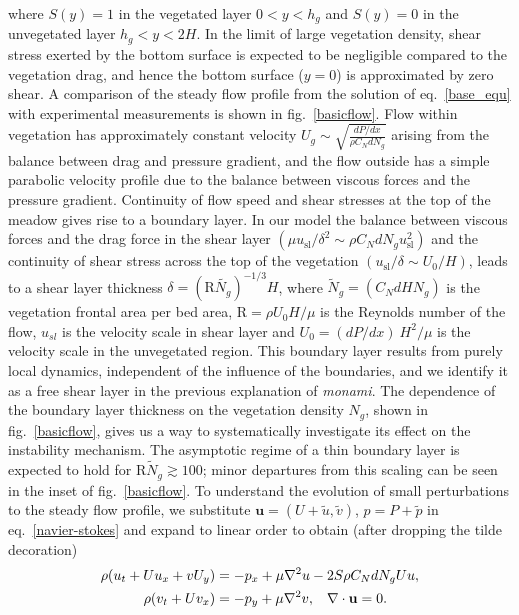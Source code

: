 \documentclass[aps,prl,twocolumn,superscriptaddress,10pt]{revtex4-1}  %
\newcommand{\bu}{\mathbf{u}}
\newcommand{\hg}{h_g}
\newcommand{\Rey}{\text{R}}
\newcommand{\Ndg}{\tilde{N}_g}
\newcommand{\monami}{\textit{monami}}
\begin{document}
where $S(y)=1$ in the vegetated layer $0<y<\hg$ and $S(y)=0$ in the unvegetated layer $\hg< y< 2H$. 
In the limit of large vegetation density, shear stress exerted by the bottom surface is expected to be negligible compared to the vegetation drag, and hence the bottom surface ($y=0$) is approximated by zero shear.   
A comparison of the steady flow profile from the solution of eq.~\eqref{base_equ} with experimental measurements is shown in fig.~\ref{basicflow}.
Flow within vegetation has approximately constant velocity $U_g \sim \sqrt{\frac{dP/dx}{\rho C_N dN_g}}$ arising from the balance between drag and pressure gradient, and the flow outside has a simple parabolic velocity profile due to the balance between viscous forces and the pressure gradient. 
Continuity of flow speed and shear stresses at the top of the meadow gives rise to a boundary layer.
In our model the balance between viscous forces and the drag force in the shear layer $(\mu u_\text{sl}/\delta^2 \sim \rho C_N d N_g u_\text{sl}^2)$ and the continuity of shear stress across the top of the vegetation $(u_\text{sl}/\delta \sim U_0/H)$, leads to a shear layer thickness $\delta=(\Rey\tilde{N_g})^{-1/3}H$, where $\Ndg = \left(C_N d H N_g\right)$ is the vegetation frontal area per bed area, $\Rey=\rho U_0 H/\mu$ is the Reynolds number of the flow, $u_{sl}$ is the velocity scale in shear layer and $U_0 = {(dP/dx)~H^2}/{\mu}$ is the velocity scale in the unvegetated region. 
This boundary layer results from purely local dynamics, independent of the influence of the boundaries, and we identify it as a free shear layer \cite{Ghisal02} in the previous explanation of \monami. 
The dependence of the boundary layer thickness on the vegetation density $N_g$, shown in fig.~\ref{basicflow}, gives us a way to systematically investigate its effect on the instability mechanism.
The asymptotic regime of a thin boundary layer is expected to hold for $\Rey \Ndg \gtrsim 100$; minor departures from this scaling can be seen in the inset of fig.~\ref{basicflow}.
\newline
To understand the evolution of small perturbations to the steady flow profile, we substitute $\bu = (U+\tilde{u}, \tilde{v})$, $p=P+\tilde{p}$ in eq.~\eqref{navier-stokes} and expand to linear order to obtain (after dropping the tilde decoration)
\begin{equation}
\begin{split}
\rho(u_t+U u_x+vU_y) &= -p_x+ {\mu}\nabla^2u-2S\rho C_{N}dN_{g}Uu, \\
\rho(v_t+ Uv_x) &= -p_y+ {\mu}\nabla^2v, \hspace{0.3cm} \nabla\cdot\bu=0.
\end{split}
\end{equation}
\end{document}
